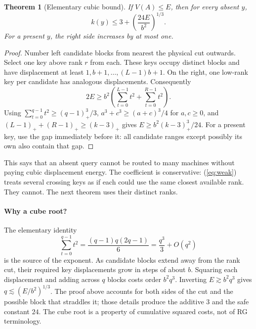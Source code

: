 \documentclass[10pt,letterpaper]{article}
\newtheorem{theorem}{Theorem}
\begin{document}
\begin{theorem}[Elementary cubic bound]\label{thm:cubic}
 If $V(A)\le E$, then for every absent $y$,
 \begin{equation}\label{eq:cubic}
 k(y)\le 3+\left(\frac{24E}{b^2}\right)^{1/3}.
 \end{equation}
 For a present $y$, the right side increases by at most one.
\end{theorem}
\begin{proof}
Number left candidate blocks from nearest the physical cut outwards. Select one key above rank $r$ from each. These keys occupy distinct blocks and have displacement at least $1,b+1,\ldots,(L-1)b+1$. On the right, one low-rank key per candidate has analogous displacements. Consequently
\begin{equation}\label{eq:weak}
2E\ge b^2\left(\sum_{t=0}^{L-1}t^2+\sum_{t=0}^{R-1}t^2\right).
\end{equation}
Using $\sum_{t=0}^{q-1}t^2\ge(q-1)_+^3/3$, $a^3+c^3\ge(a+c)^3/4$ for $a,c\ge0$, and $(L-1)_++(R-1)_+\ge(k-3)_+$ gives $E\ge b^2(k-3)_+^3/24$. For a present key, use the gap immediately before it: all candidate ranges except possibly its own also contain that gap.
\end{proof}
This says that an absent query cannot be routed to many machines without paying cubic displacement energy. The coefficient is conservative: (\ref{eq:weak}) treats several crossing keys as if each could use the same closest available rank. They cannot. The next theorem uses their distinct ranks.

\paragraph{Why a cube root?} The elementary identity
\begin{equation}\label{eq:squares}
 \sum_{t=0}^{q-1}t^2=\frac{(q-1)q(2q-1)}6=\frac{q^3}{3}+O(q^2)
\end{equation}
is the source of the exponent. As candidate blocks extend away from the rank cut, their required key displacements grow in steps of about $b$. Squaring each displacement and adding across $q$ blocks costs order $b^2q^3$. Inverting $E\gtrsim b^2q^3$ gives $q\lesssim(E/b^2)^{1/3}$. The proof above accounts for both sides of the cut and the possible block that straddles it; those details produce the additive $3$ and the safe constant $24$. The cube root is a property of cumulative squared costs, not of RG terminology.
\end{document}
